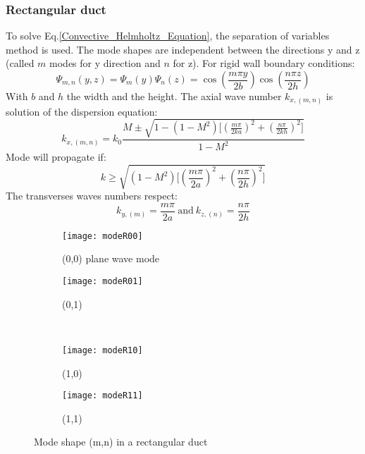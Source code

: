 \subsubsection{Rectangular duct} \label{sec:RectDuct}
To solve Eq.\eqref{Convective_Helmholtz_Equation}, the separation of variables method is used. The mode shapes are independent between the directions y and z (called $m$ modes for y direction and $n$ for z). For rigid wall boundary conditions:
\begin{equation} 
    \Psi_{m,n}(y,z)=\Psi_{m}(y)\Psi_{n}(z)=\cos(\frac{m\pi y}{2b})\cos(\frac{n\pi z}{2h})
\end{equation}
With $b$ and $h$ the width and the height.
The axial wave number $k_{x,(m,n)}$ is solution of the dispersion equation: 
\begin{equation} 
    k_{x,(m,n)}=k_0\frac{M\pm\sqrt{1-(1-M^2)\Big[(\frac{m\pi}{2ka})^2+(\frac{n\pi}{2kh})^2\Big]}}{1-M^2}
\end{equation}
Mode will propagate if:
\begin{equation} 
    k\geq\sqrt{(1-M^2)\Big[(\frac{m\pi}{2a})^2+(\frac{n\pi}{2h})^2\Big]}
\end{equation}
The transverses waves numbers respect: 
\begin{equation} 
    k_{y,(m)}=\frac{m\pi}{2a} \ \text{and} \ k_{z,(n)}=\frac{n\pi}{2h}
\end{equation}
\begin{figure}[H] \centering
    \begin{subfigure}{.5\textwidth}\centering
     \texttt{[image: modeR00]}
     \caption{(0,0) plane wave mode}
    \end{subfigure}%
    \begin{subfigure}{.5\textwidth}\centering
     \texttt{[image: modeR01]}
     \caption{(0,1)}
    \end{subfigure}\\
    \begin{subfigure}{.5\textwidth}\centering
     \texttt{[image: modeR10]}
     \caption{(1,0)}
    \end{subfigure}%
    \begin{subfigure}{.5\textwidth}\centering
     \texttt{[image: modeR11]}
     \caption{(1,1)}
    \end{subfigure}
    \caption{Mode shape (m,n) in a rectangular duct}
\end{figure}
